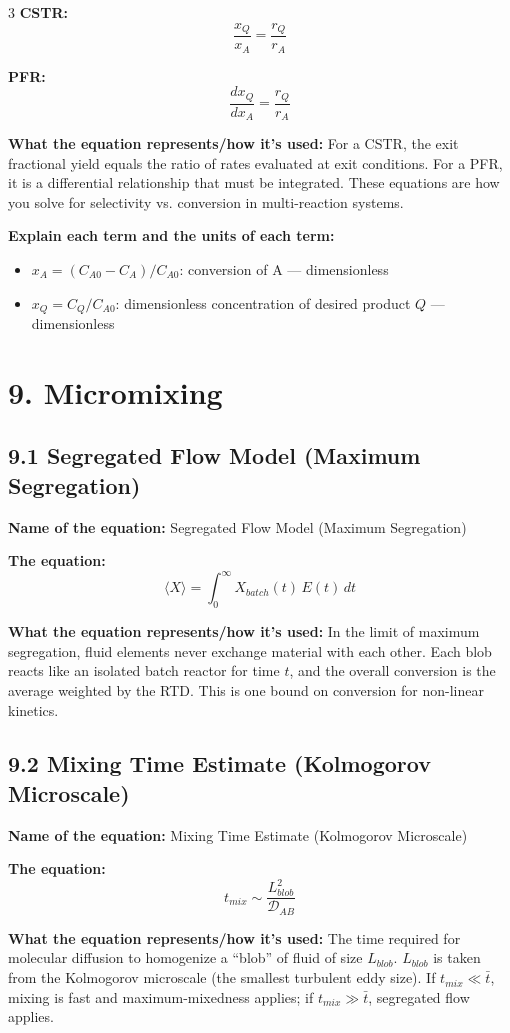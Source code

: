 \documentclass[8pt]{extarticle}
\begin{document}
\begin{multicols*}{3}
\textbf{CSTR:}
\[
\frac{x_Q}{x_A}=\frac{r_Q}{r_A}
\]

\textbf{PFR:}
\[
\frac{dx_Q}{dx_A}=\frac{r_Q}{r_A}
\]

\textbf{What the equation represents/how it's used:} For a CSTR, the exit fractional yield equals the ratio of rates evaluated at exit conditions. For a PFR, it is a differential relationship that must be integrated. These equations are how you solve for selectivity vs. conversion in multi-reaction systems.

\textbf{Explain each term and the units of each term:}
\begin{itemize}
\item \(x_A=(C_{A0}-C_A)/C_{A0}\): conversion of A --- dimensionless
\item \(x_Q=C_Q/C_{A0}\): dimensionless concentration of desired product \(Q\) --- dimensionless
\end{itemize}

\section*{9. Micromixing}

\subsection*{9.1 Segregated Flow Model (Maximum Segregation)}

\textbf{Name of the equation:} Segregated Flow Model (Maximum Segregation)

\textbf{The equation:}
\[
\langle X\rangle=\int_0^\infty X_{batch}(t)\,E(t)\,dt
\]

\textbf{What the equation represents/how it's used:} In the limit of maximum segregation, fluid elements never exchange material with each other. Each blob reacts like an isolated batch reactor for time \(t\), and the overall conversion is the average weighted by the RTD. This is one bound on conversion for non-linear kinetics.

\subsection*{9.2 Mixing Time Estimate (Kolmogorov Microscale)}

\textbf{Name of the equation:} Mixing Time Estimate (Kolmogorov Microscale)

\textbf{The equation:}
\[
t_{mix}\sim \frac{L_{blob}^2}{\mathcal{D}_{AB}}
\]

\textbf{What the equation represents/how it's used:} The time required for molecular diffusion to homogenize a ``blob'' of fluid of size \(L_{blob}\). \(L_{blob}\) is taken from the Kolmogorov microscale (the smallest turbulent eddy size). If \(t_{mix}\ll \bar{t}\), mixing is fast and maximum-mixedness applies; if \(t_{mix}\gg \bar{t}\), segregated flow applies.


\end{multicols*}
\end{document}
